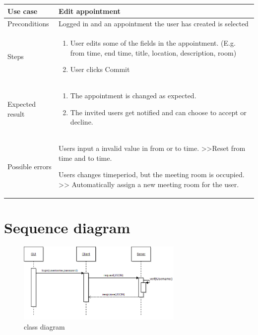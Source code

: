 \documentclass[a4paper, 10pt]{article}
\begin{document}
\begin{tabularx}{\textwidth}{ |X|X| }
\hline
\rowcolor{Gray}
Use case &  Edit appointment \\ \hline
Preconditions & Logged in and an appointment the user has created is selected \\ \hline
Steps & 
\begin{enumerate}
	\item User edits some of the fields in the appointment. (E.g. from time, end time, title, location, description, room)
	\item User clicks Commit
\end{enumerate}\\ \hline
Expected result & 
\begin{enumerate}
	\item The appointment is changed as expected. 
	\item The invited users get notified and can choose to accept or decline.
\end{enumerate} \\ \hline
Possible errors & 
\begin{scenario}
	\item Users input a invalid value in from or to time. >>Reset from time and to time.
	\item Users changes timeperiod, but the meeting room is occupied. >> Automatically assign a new meeting room for the user.
\end{scenario} \\ \hline
\end{tabularx}

\section{Sequence diagram}
\begin{figure}[h!] 
    \begin{center}  
        \includegraphics[width=8cm]{img/seqLogin.png}
        \caption{class diagram}
    \label{class}
    \end{center}
\end{figure}
\end{document}
